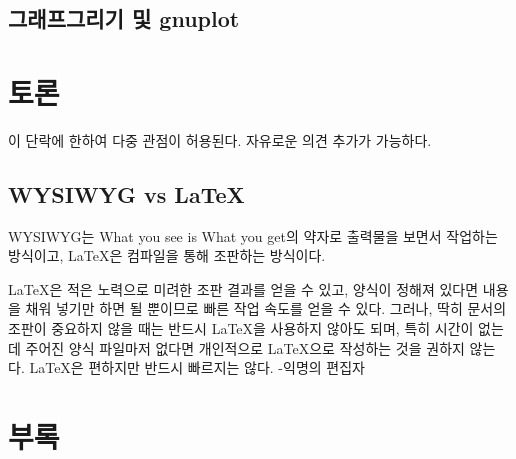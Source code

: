 \documentclass[11pt]{article}
\begin{document}
\subsection{그래프그리기 및 gnuplot}

\section{토론}
이 단락에 한하여 다중 관점이 허용된다. 자유로운 의견 추가가 가능하다.

\subsection{WYSIWYG vs LaTeX}
WYSIWYG는 What you see is What you get의 약자로 출력물을 보면서 작업하는 
방식이고, LaTeX은 컴파일을 통해 조판하는 방식이다.

LaTeX은 적은 노력으로 미려한 조판 결과를 얻을 수 있고, 양식이 정해져 있다면 
내용을 채워 넣기만 하면 될 뿐이므로 빠른 작업 속도를 얻을 수 있다.
그러나, 딱히 문서의 조판이 중요하지 않을 때는 반드시 LaTeX을 사용하지 않아도 
되며, 특히 시간이 없는데 주어진 양식 파일마저 없다면 개인적으로 LaTeX으로 
작성하는 것을 권하지 않는다. LaTeX은 편하지만 반드시 빠르지는 않다. -익명의 
편집자

\section{부록}

\tableofcontents
\listoffigures
\listoftables

\begin{thebibliography}{00}
\end{thebibliography}
\end{document}
